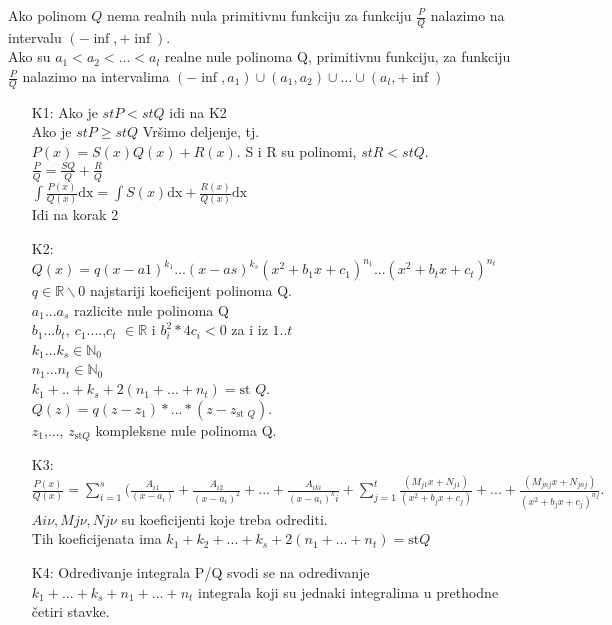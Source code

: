 \documentclass{article}
\begin{document}
Ako polinom $Q$ nema realnih nula primitivnu funkciju za funkciju $\frac{P}{Q}$ nalazimo na intervalu $(-\inf, +\inf)$.\\
Ako su $a_1 < a_2 < ... < a_l$ realne nule polinoma Q, primitivnu funkciju, za funkciju $\frac{P}{Q}$ nalazimo na intervalima $(-\inf, a_1)\cup(a_1, a_2)\cup...\cup(a_l,+\inf)$
\begin{enumerate}
    \item[K1:] Ako je $stP < stQ$ idi na K2\\
          Ako je $stP \geq stQ$ Vršimo deljenje, tj.\\
          $P(x) = S(x)Q(x) + R(x)$. S i R su polinomi, $st R < st Q$.\\
          $\frac{P}{Q} = \frac{SQ}{Q} + \frac{R}{Q}$\\
          $\int\frac{P(x)}{Q(x)}\text{dx} = \int S(x)\text{dx} + \frac{R(x)}{Q(x)}\text{dx}$\\
          Idi na korak 2
    \item[K2:] $Q(x) = q(x - a1)^{k_1}...(x-as)^{k_s}(x^2 + b_1x + c_1)^{n_1}...(x^2 + b_tx + c_t)^{n_t}$\\
          $q \in \mathbb{R}\backslash0$ najstariji koeficijent polinoma Q.\\
          $a_1$...$a_s$ razlicite nule polinoma Q\\
          $b_1$...$b_t,\ c_1$....,$c_t$ $\in \mathbb{R}$ i $b_i^2 * 4c_i < 0$ za i iz $1..t$\\
          $k_1$...$k_s \in \mathbb{N}_0$\\
          $n_1$...$n_t \in \mathbb{N}_0$\\
          $k_1+..+k_s+2(n_1+...+n_t) = \text{st }Q$.\\
          $Q(z) = q(z-z_1) *...*(z-z_{\text{st }Q})$.\\
          $z_1$,..., $z_{\text{st}Q}$ kompleksne nule polinoma Q.
    \item[K3:]  $\frac{P(x)}{Q(x)} = \sum_{i = 1}^s (\frac{A_{i1}}{(x-a_i)} + \frac{A_{i2}}{(x - a_i)^2} + ... + \frac{A_{iki}}{(x-a_i)^ki} + \sum_{j = 1}^t \frac{(M_{j1}x + N_{j1})}{(x^2 + b_jx + c_j)} + ... + \frac{(M_{jnj}x + N_{jnj})}{(x^2 + b_jx + c_j)^{nj}}.$\\
          $Ai\nu, Mj\nu, Nj\nu$ su koeficijenti koje treba odrediti.\\
          Tih koeficijenata ima $k_1 + k_2+...+k_s+ 2(n_1+...+n_t) = \text{st} Q$
    \item[K4:] Određivanje integrala P/Q svodi se na određivanje $k_1+...+k_s+n_1+...+n_t$ integrala koji su jednaki integralima u prethodne četiri stavke.
\end{enumerate}
\end{document}
